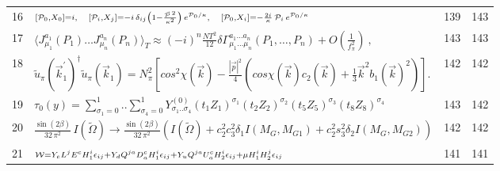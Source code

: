 \documentclass{article}
\begin{document}
\begin{figure*}
\begin{tabular}{llcc}
\scriptsize{16} & $\scriptstyle{[ { \cal P } _ { 0 } , X _ { 0 } ] = i , \quad [ { \cal P } _ { i } , X _ { j } ] = - i \, \delta _ { i j } \left( 1 - \frac { \vec { { \cal P } } \, { } ^ { 2 } } { \kappa ^ { 2 } } \right) \, e ^ { { \cal P } _ { 0 } / \kappa } , \quad [ { \cal P } _ { 0 } , X _ { i } ] = - \frac { 2 i } \kappa \, { \cal P } _ { i } \, e ^ { { \cal P } _ { 0 } / \kappa } }$ & \scriptsize{139} & \scriptsize{143} \\
\scriptsize{17} & $\scriptstyle{\langle J _ { \mu _ { 1 } } ^ { a _ { 1 } } ( P _ { 1 } ) \ldots J _ { \mu _ { n } } ^ { a _ { n } } ( P _ { n } ) \rangle _ { T } \approx ( - i ) ^ { n } \frac { N T ^ { 2 } } { 1 2 } \delta \Gamma _ { \mu _ { 1 } \ldots \mu _ { n } } ^ { a _ { 1 } \ldots a _ { n } } ( P _ { 1 } , \ldots , P _ { n } ) + O ( \frac { 1 } { f _ { \pi } ^ { 2 } } ) \ , }$ & \scriptsize{143} & \scriptsize{143} \\
\scriptsize{18} & $\scriptstyle{\tilde { u } _ { \pi } ( \vec { k } _ { 1 } ^ { \prime } ) ^ { \dagger } \tilde { u } _ { \pi } ( \vec { k } _ { 1 } ) = N _ { \pi } ^ { 2 } \left[ c o s ^ { 2 } \chi ( \vec { k } ) - \frac { | \vec { p } | ^ { 2 } } { 4 } \left( c o s \chi ( \vec { k } ) c _ { 2 } ( \vec { k } ) + \frac { 1 } { 3 } \vec { k } ^ { 2 } b _ { 1 } ( \vec { k } ) ^ { 2 } \right) \right] . }$ & \scriptsize{142} & \scriptsize{142} \\
\scriptsize{19} & $\scriptstyle{\tau _ { 0 } ( y ) = \sum _ { \sigma _ { 1 } = 0 } ^ { 1 } . . \sum _ { \sigma _ { 4 } = 0 } ^ { 1 } Y _ { \sigma _ { 1 } . . \sigma _ { 4 } } ^ { ( 0 ) } ( t _ { 1 } Z _ { 1 } ) ^ { \sigma _ { 1 } } ( t _ { 2 } Z _ { 2 } ) ^ { \sigma _ { 2 } } ( t _ { 5 } Z _ { 5 } ) ^ { \sigma _ { 3 } } ( t _ { 8 } Z _ { 8 } ) ^ { \sigma _ { 4 } } }$ & \scriptsize{143} & \scriptsize{142} \\
\scriptsize{20} & $\scriptstyle{\frac { \operatorname { s i n } ( 2 \beta ) } { 3 2 \, \pi ^ { 2 } } \, I ( \tilde { \Omega } ) \rightarrow \frac { \operatorname { s i n } ( 2 \beta ) } { 3 2 \, \pi ^ { 2 } } ( I ( \tilde { \Omega } ) + c _ { 2 } ^ { 2 } c _ { 3 } ^ { 2 } \delta _ { 1 } I ( M _ { G } , M _ { G 1 } ) + c _ { 2 } ^ { 2 } s _ { 3 } ^ { 2 } \delta _ { 2 } I ( M _ { G } , M _ { G 2 } ) ) }$ & \scriptsize{142} & \scriptsize{142} \\
\scriptsize{21} & $\scriptstyle{{ \cal W } = Y _ { e } L ^ { j } E ^ { c } H _ { 1 } ^ { i } { \epsilon _ { i j } } + Y _ { d } Q ^ { j a } D _ { a } ^ { c } H _ { 1 } ^ { i } { \epsilon _ { i j } } + Y _ { u } Q ^ { j a } U _ { a } ^ { c } H _ { 2 } ^ { i } { \epsilon _ { i j } } + \mu H _ { 1 } ^ { i } H _ { 2 } ^ { j } { \epsilon _ { i j } } }$ & \scriptsize{141} & \scriptsize{141} \\

\end{tabular}
\end{figure*}
\end{document}
